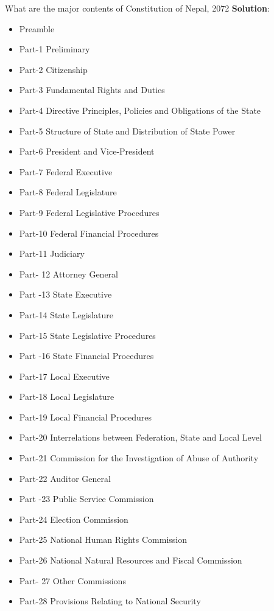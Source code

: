 \documentclass[
  openany]{book}
\newcommand{\question}{\item}
\newenvironment{solution}{ {\bfseries Solution}:}{}
\begin{document}
\begin{questions}
\question What are the major contents of Constitution of Nepal, 2072
  \begin{solution}
  \begin{itemize}
  \item Preamble
  \item Part-1 Preliminary
  \item Part-2 Citizenship
  \item Part-3 Fundamental Rights and Duties
  \item Part-4 Directive Principles, Policies and Obligations of the State
  \item Part-5 Structure of State and Distribution of State Power
  \item Part-6 President and Vice-President
  \item Part-7 Federal Executive
  \item Part-8 Federal Legislature
  \item Part-9 Federal Legislative Procedures
  \item Part-10 Federal Financial Procedures
  \item Part-11 Judiciary
  \item Part- 12 Attorney General
  \item Part -13 State Executive
  \item Part-14 State Legislature
  \item Part-15 State Legislative Procedures
  \item Part -16 State Financial Procedures
  \item Part-17 Local Executive
  \item Part-18 Local Legislature
  \item Part-19 Local Financial Procedures
  \item Part-20 Interrelations between Federation, State and Local Level
  \item Part-21 Commission for the Investigation of Abuse of Authority
  \item Part-22 Auditor General
  \item Part -23 Public Service Commission
  \item Part-24 Election Commission
  \item Part-25 National Human Rights Commission
  \item Part-26 National Natural Resources and Fiscal Commission
  \item Part- 27 Other Commissions
  \item Part-28 Provisions Relating to National Security

\end{itemize}
\end{solution}
\end{questions}
\end{document}
